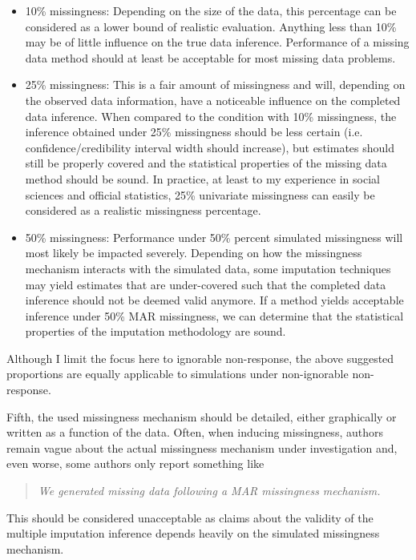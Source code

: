 \documentclass[bimj,fleqn]{w-art}
\begin{document}
\begin{itemize}
  \item 10\% missingness: Depending on the size of the data, this percentage can be considered as a lower bound of realistic evaluation. Anything less than 10\% may be of little influence on the true data inference. Performance of a missing data method should at least be acceptable for most missing data problems. 
  \item 25\% missingness: This is a fair amount of missingness and will, depending on the observed data information, have a noticeable influence on the completed data inference. When compared to the condition with 10\% missingness, the inference obtained under 25\% missingness should be less certain (i.e. confidence/credibility interval width should increase), but estimates should still be properly covered and the statistical properties of the missing data method should be sound. In practice, at least to my experience in social sciences and official statistics, 25\% univariate missingness can easily be considered as a realistic missingness percentage. 
  \item 50\% missingness: Performance under 50\% percent simulated missingness will most likely be impacted severely. Depending on how the missingness mechanism interacts with the simulated data, some imputation techniques may yield estimates that are under-covered such that the completed data inference should not be deemed valid anymore. If a method yields acceptable inference under 50\% MAR missingness, we can determine that the statistical properties of the imputation methodology are sound. 
\end{itemize}
Although I limit the focus here to ignorable non-response, the above suggested proportions are equally applicable to simulations under non-ignorable non-response.

Fifth, the used missingness mechanism should be detailed, either graphically or written as a function of the data. Often, when inducing missingness, authors remain vague about the actual missingness mechanism under investigation and, even worse, some authors only report something like
\begin{quote}
\emph{We generated missing data following a MAR missingness mechanism.}
\end{quote}
This should be considered unacceptable as claims about the validity of the multiple imputation inference depends heavily on the simulated missingness mechanism. 

\end{document}
